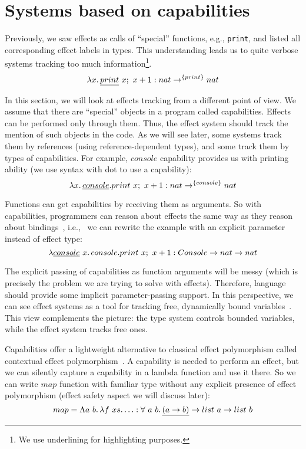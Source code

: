 \documentclass[conference]{IEEEtran}
\newcommand{\seq}{;~}
\newcommand{\ap}{~}
\begin{document}
    \section{Systems based on capabilities} \label{sec:capabilities}

    Previously, we saw effects as calls of ``special'' functions, e.g., \texttt{print}, and listed all corresponding effect labels in types.
    This understanding leads us to quite verbose systems tracking too much information\footnote{We use underlining for highlighting purposes.}.
    \[\lambda x\ldotp \underline{print}\ap x\seq x + 1 : nat \to^{\{print\}} nat\]

    In this section, we will look at effects tracking from a different point of view.
    We assume that there are ``special'' objects in a program called capabilities.
    Effects can be performed only through them.
    Thus, the effect system should track the mention of such objects in the code.
    As we will see later, some systems track them by references (using reference-dependent types), and some track them by types of capabilities.
    For example, $console$ capability provides us with printing ability (we use syntax with dot to use a capability):
    \[\lambda x\ldotp \underline{console}.print\ap x\seq x + 1 : nat \to^{\{console\}} nat\]

    Functions can get capabilities by receiving them as arguments.
    So with capabilities, programmers can reason about effects the same way as they reason about bindings~\cite{brachthauser2022effects}, i.e., \ we can rewrite the example with an explicit parameter instead of effect type:
    \[\lambda \underline{console} \ap x \ldotp console.print\ap x\seq x + 1 : Console \to nat \to nat\]

    The explicit passing of capabilities as function arguments will be messy (which is precisely the problem we are trying to solve with effects).
    Therefore, language should provide some implicit parameter-passing support.
    In this perspective, we can see effect systems as a tool for tracking free, dynamically bound variables~\cite{odersky2022scoped}.
    This view complements the picture: the type system controls bounded variables, while the effect system tracks free ones.

    Capabilities offer a lightweight alternative to classical effect polymorphism called contextual effect polymorphism~\cite{brachthauser2022effects}.
    A capability is needed to perform an effect, but we can silently capture a capability in a lambda function and use it there.
    So we can write $map$ function with familiar type without any explicit presence of effect polymorphism (effect safety aspect we will discuss later):
    \[map = \Lambda a \ap b\ldotp \lambda f\ap xs\ldotp \ldots : \forall \ap a \ap b\ldotp \underline{(a \to b)} \to list \ap a \to list \ap b \]
\end{document}
